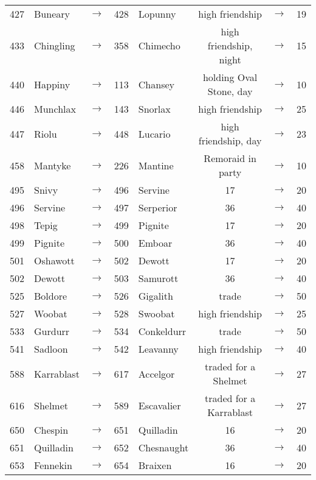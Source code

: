 \documentclass{article}
\begin{document}
\begin{longtable}{rlcrl|ccc}
427 & Buneary & $\rightarrow$ & 428 & Lopunny & high friendship & $\rightarrow$ & 19 \\
433 & Chingling & $\rightarrow$ & 358 & Chimecho & high friendship, night & $\rightarrow$ & 15 \\
440 & Happiny & $\rightarrow$ & 113 & Chansey & holding Oval Stone, day & $\rightarrow$ & 10 \\
446 & Munchlax & $\rightarrow$ & 143 & Snorlax & high friendship & $\rightarrow$ & 25 \\
447 & Riolu & $\rightarrow$ & 448 & Lucario & high friendship, day & $\rightarrow$ & 23 \\
458 & Mantyke & $\rightarrow$ & 226 & Mantine & Remoraid in party & $\rightarrow$ & 10 \\
\hline %
495 & Snivy & $\rightarrow$ & 496 & Servine & 17 & $\rightarrow$ & 20 \\
496 & Servine & $\rightarrow$ & 497 & Serperior & 36 & $\rightarrow$ & 40 \\
498 & Tepig & $\rightarrow$ & 499 & Pignite & 17 & $\rightarrow$ & 20 \\
499 & Pignite & $\rightarrow$ & 500 & Emboar & 36 & $\rightarrow$ & 40 \\
501 & Oshawott & $\rightarrow$ & 502 & Dewott & 17 & $\rightarrow$ & 20 \\
502 & Dewott & $\rightarrow$ & 503 & Samurott & 36 & $\rightarrow$ & 40 \\
525 & Boldore & $\rightarrow$ & 526 & Gigalith & trade & $\rightarrow$ & 50 \\
527 & Woobat & $\rightarrow$ & 528 & Swoobat & high friendship & $\rightarrow$ & 25 \\
533 & Gurdurr & $\rightarrow$ & 534 & Conkeldurr & trade & $\rightarrow$ & 50 \\
541 & Sadloon & $\rightarrow$ & 542 & Leavanny & high friendship & $\rightarrow$ & 40 \\
588 & Karrablast & $\rightarrow$ & 617 & Accelgor & traded for a Shelmet & $\rightarrow$ & 27 \\
616 & Shelmet & $\rightarrow$ & 589 & Escavalier & traded for a Karrablast & $\rightarrow$ & 27 \\
\hline %
650 & Chespin & $\rightarrow$ & 651 & Quilladin & 16 & $\rightarrow$ & 20 \\
651 & Quilladin & $\rightarrow$ & 652 & Chesnaught & 36 & $\rightarrow$ & 40 \\
653 & Fennekin & $\rightarrow$ & 654 & Braixen & 16 & $\rightarrow$ & 20 \\

\end{longtable}
\end{document}
